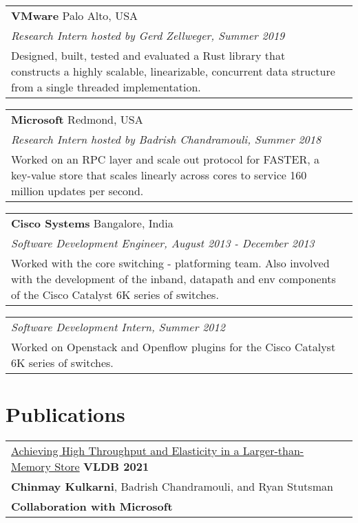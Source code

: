\documentclass[margin,line]{res}
\begin{document}
\begin{resume}
\vspace{-7pt}
\begin{tabular}{@{}p{5.5in}p{4in}}
{\bf VMware} \dotfill Palo Alto, USA \\
{\small\em Research Intern hosted by Gerd Zellweger, Summer 2019}\\
{\small
Designed,
built, tested and evaluated a Rust library that constructs a highly scalable, linearizable,
concurrent data
structure from a single threaded implementation.}
\end{tabular}

\vspace{-7pt}
\begin{tabular}{@{}p{5.5in}p{4in}}
{\bf Microsoft} \dotfill Redmond, USA \\
{\small\em Research Intern hosted by Badrish Chandramouli, Summer 2018}\\
{\small Worked on an RPC layer and scale out protocol for FASTER, a
key-value store that scales linearly across cores to service 160 million
updates per second.}
\end{tabular}

\vspace{-7pt}
\begin{tabular}{@{}p{5.5in}p{4in}}
{\bf Cisco Systems} \dotfill Bangalore, India \\
{\small\em Software Development Engineer, August 2013 - December 2013}\\
{\small Worked with the core switching - platforming team. Also involved with the
development of the inband, datapath and env components of the
Cisco Catalyst 6K series of switches.}
\end{tabular}

\vspace{-7pt}
\begin{tabular}{@{}p{5.5in}p{4in}}
{\small\em Software Development Intern, Summer 2012}\\
{\small Worked on Openstack and Openflow plugins for the
Cisco Catalyst 6K series of switches.}
\end{tabular}

\section{\sc Publications}
 \begin{tabular}{@{}p{5.5in}p{4in}}
 \href{https://microsoft.github.io/FASTER/}{Achieving High Throughput and
 Elasticity in a Larger-than-Memory Store} \hfill
 {\small\bf VLDB 2021}\\
 {\small {\bf Chinmay Kulkarni}, Badrish Chandramouli, and Ryan
 Stutsman}\\
 {\small\bf Collaboration with Microsoft}\\
 \end{tabular}


\end{resume}
\end{document}
